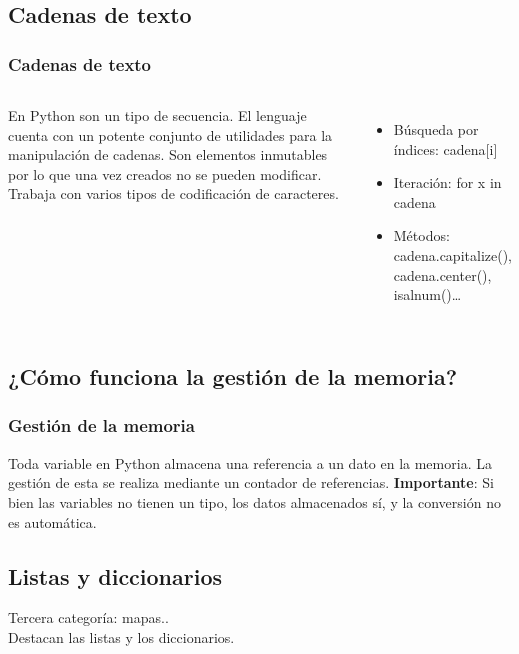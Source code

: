 \documentclass{beamer}
\begin{document}
\subsection{Cadenas de texto}
\begin{frame}
\frametitle{Cadenas de texto}
\begin{columns}[c]
En Python son un tipo de secuencia. El lenguaje cuenta con un potente conjunto de utilidades para la manipulación de cadenas. Son elementos inmutables por lo que una vez creados no se pueden modificar. Trabaja con varios tipos de codificación de caracteres.

\lstset{language=python, showspaces=false}

\begin{itemize}
\item Búsqueda por índices: cadena[i]
\item Iteración: for x in cadena
\item Métodos: cadena.capitalize(), cadena.center(), isalnum()\dots
\end{itemize}
\end{columns}
\end{frame}

\subsection{¿Cómo funciona la gestión de la memoria?}
\begin{frame}
\frametitle{Gestión de la memoria}
Toda variable en Python almacena una referencia a un dato en la memoria. La gestión de esta se realiza mediante un contador de referencias.\newline
\textbf{Importante}: Si bien las variables no tienen un tipo, los datos almacenados sí, y la conversión no es automática.
\end{frame}

\subsection{Listas y diccionarios}
\begin{frame}
Tercera categoría: mapas..\\
Destacan las listas y los diccionarios.
\end{frame}
\end{document}
